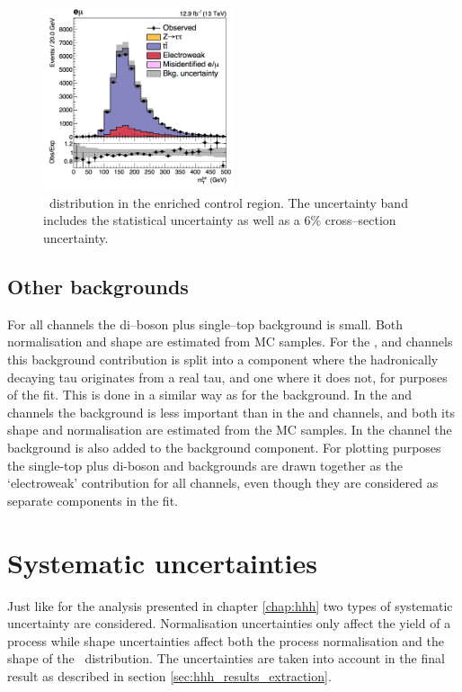 \begin{figure}[h!]
\begin{center}
\includegraphics[width=0.5\textwidth]{./MSSM/Figures/mt_tot_ttcontrol_em_2016.png}
\end{center}
\caption{\mTtot~distribution in the \ttbar enriched control region.
The uncertainty band includes the statistical uncertainty as well as a 6\% \ttbar cross--section uncertainty.}
\label{fig:mssm_corrs_toppt}
\end{figure}


\subsection{Other backgrounds}
\label{sec:mssm_bkgs_other}
For all channels the di--boson plus 
single--top background is small.
Both normalisation and shape are estimated from \ac{MC}
samples. For the \etau, \mutau and \tautau channels
this background contribution is split into a component
where the hadronically decaying tau originates from a real
tau, and one where it does not, for purposes of the fit. This is done in a similar
way as for the \ttbar background.
In the \tautau and \emu channels the \Wjets background
is less important than in the \etau and \mutau channels, and both
its shape and normalisation are estimated from the
\ac{MC} samples. In the \emu channel the \PW\Pphoton background
is also added to the \Wjets background component. For plotting purposes the single-top plus
di-boson and \Wjets backgrounds are drawn together as the `electroweak' contribution for all channels, even though
they are considered as separate components in the fit.


\section{Systematic uncertainties}
\label{sec:mssm_uncs}
Just like for the analysis presented in chapter \ref{chap:hhh}
two types of systematic uncertainty are considered. Normalisation
uncertainties only affect the yield of a process while shape
uncertainties affect both the process normalisation and the shape
of the \mTtot~distribution. The uncertainties are taken into account 
in the final result as described in section \ref{sec:hhh_results_extraction}.

